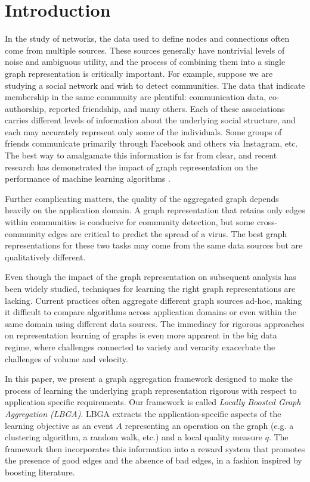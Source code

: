 \documentclass[twoside,twocolumn]{article}
\begin{document}
\section{Introduction}
In the study of networks, the data used to define nodes and connections often
come from multiple sources. These sources generally have nontrivial levels of
noise and ambiguous utility, and the process of combining them into a single
graph representation is critically important. For example, suppose we are
studying a social network and wish to detect communities. The data that
indicate membership in the same community are plentiful: communication data,
co-authorship, reported friendship, and many others. Each of these associations
carries different levels of information about the underlying social structure,
and each may accurately represent only some of the individuals. Some groups of
friends communicate primarily through Facebook and others via Instagram, etc.
The best way to amalgamate this information is far from clear, and recent
research has demonstrated the impact of graph representation on the performance
of machine learning algorithms \cite{Getoor2005,Gallagher2008,Neville2005,Caceres2011}. 

Further complicating matters, the quality of the aggregated graph depends
heavily on the application domain. A graph representation that retains only 
edges within communities is conducive for community detection, but some
cross-community edges are critical to predict the spread of a virus. The best
graph representations for these two tasks may come from the same data sources
but are qualitatively different. 

Even though the impact of the graph representation on subsequent analysis has
been widely studied, techniques for learning the right graph representations are lacking. 
Current practices often aggregate different graph sources ad-hoc, making it difficult to compare
algorithms across application domains or even within the same domain using
different data sources. The immediacy for rigorous approaches on representation learning of graphs is even more apparent
in the big data regime, where challenges connected to variety and veracity exacerbate the challenges of volume and velocity.


In this paper, we present a graph aggregation framework designed to make the
process of learning the underlying graph representation rigorous with respect
to application specific requirements.  Our framework is called {\em Locally
Boosted Graph Aggregation (LBGA)}.  LBGA extracts the application-specific
aspects of the learning objective as an event $A$ representing an operation on
the graph (e.g. a clustering algorithm, a random walk, etc.) and a local
quality measure $q$. The framework then incorporates this information into a
reward system that promotes the presence of good edges and the absence of bad
edges, in a fashion inspired by boosting literature.
\end{document}
